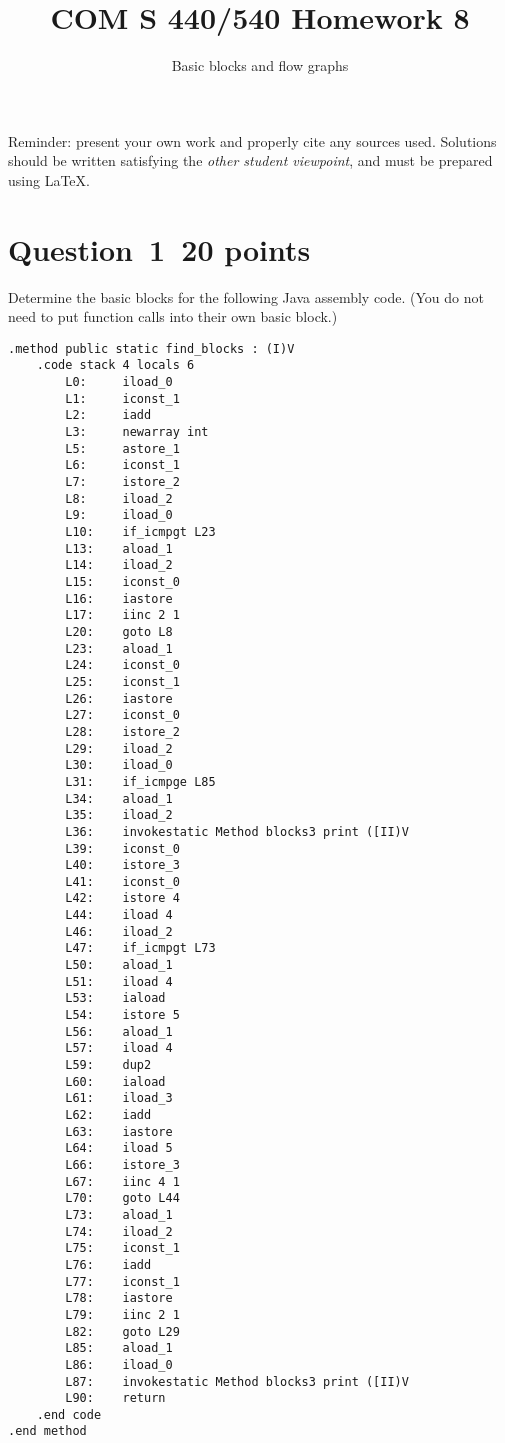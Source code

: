 \documentclass[10pt]{article}
\title{COM S 440/540 Homework 8}
\date{}
\author{Basic blocks and flow graphs}
\begin{document}
\maketitle

\noindent
Reminder: present your own work and properly cite any sources used.
Solutions should be written satisfying the \emph{other student viewpoint},
and must be prepared using \LaTeX.
\renewcommand{\thepage}{~}
\section*{Question~1~\hfill 20 points}
Determine the basic blocks for the following Java assembly code.
(You do not need to put function calls into their own basic block.)
\begin{lstlisting}[style=jvm,numbers=none]
.method public static find_blocks : (I)V 
    .code stack 4 locals 6 
        L0:     iload_0 
        L1:     iconst_1 
        L2:     iadd 
        L3:     newarray int 
        L5:     astore_1 
        L6:     iconst_1 
        L7:     istore_2 
        L8:     iload_2 
        L9:     iload_0 
        L10:    if_icmpgt L23 
        L13:    aload_1 
        L14:    iload_2 
        L15:    iconst_0 
        L16:    iastore 
        L17:    iinc 2 1 
        L20:    goto L8 
        L23:    aload_1 
        L24:    iconst_0 
        L25:    iconst_1 
        L26:    iastore 
        L27:    iconst_0 
        L28:    istore_2 
        L29:    iload_2 
        L30:    iload_0 
        L31:    if_icmpge L85 
        L34:    aload_1 
        L35:    iload_2 
        L36:    invokestatic Method blocks3 print ([II)V 
        L39:    iconst_0 
        L40:    istore_3 
        L41:    iconst_0 
        L42:    istore 4 
        L44:    iload 4 
        L46:    iload_2 
        L47:    if_icmpgt L73 
        L50:    aload_1 
        L51:    iload 4 
        L53:    iaload 
        L54:    istore 5 
        L56:    aload_1 
        L57:    iload 4 
        L59:    dup2 
        L60:    iaload 
        L61:    iload_3 
        L62:    iadd 
        L63:    iastore 
        L64:    iload 5 
        L66:    istore_3 
        L67:    iinc 4 1 
        L70:    goto L44 
        L73:    aload_1 
        L74:    iload_2 
        L75:    iconst_1 
        L76:    iadd 
        L77:    iconst_1 
        L78:    iastore 
        L79:    iinc 2 1 
        L82:    goto L29 
        L85:    aload_1 
        L86:    iload_0 
        L87:    invokestatic Method blocks3 print ([II)V 
        L90:    return 
    .end code 
.end method 
\end{lstlisting}
\end{document}
